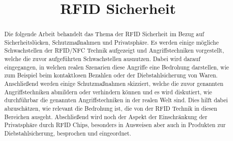 \documentclass[conference]{IEEEtran}
\begin{document}
\title{RFID Sicherheit}


\author{
}

\maketitle

\begin{abstract}
Die folgende Arbeit behandelt das Thema der RFID Sicherheit im Bezug auf Sicherheitslücken, Schutzmaßnahmen und Privatsphäre. Es werden einige mögliche Schwachstellen der RFID/NFC Technik aufgezeigt und Angriffstechniken vorgestellt, welche die zuvor aufgeführten Schwachstellen ausnutzen. Dabei wird darauf eingegangen, in welchen realen Szenarien diese Angriffe eine Bedrohung darstellen, wie zum Beispiel beim kontaktlosen Bezahlen oder der Diebstahlsicherung von Waren. Anschließend werden einige Schutzmaßnahmen skizziert, welche die zuvor genannten Angriffstechniken abmildern oder verhindern können und es wird diskutiert, wie durchführbar die genannten Angriffstechniken in der realen Welt sind. Dies hilft dabei abzuschätzen, wie relevant die Bedrohung ist, die von der RFID Technik in diesen Bereichen ausgeht. Abschließend wird noch der Aspekt der Einschränkung der Privatsphäre durch RFID Chips, besonders in Ausweisen aber auch in Produkten zur Diebstahlsicherung, besprochen und eingeordnet.
\end{abstract}
\end{document}

